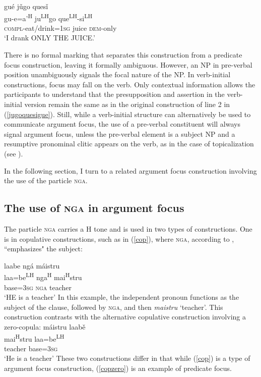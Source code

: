 \ea
\glll gu\'{e} j\v{u}go ques\v{i}  \\
gu-e=a'\textsuperscript{H} ju\textsuperscript{LH}go que\textsuperscript{LH}-si\textsuperscript{LH}  \\
\textsc{compl}-eat/drink=\textsc{1sg} juice \textsc{dem}-only  \\
\glt `I drank ONLY THE JUICE.'  

\z
There is no formal marking that separates this construction from a predicate focus construction, leaving it formally ambiguous. However, an NP in pre-verbal position unambiguously signals the focal nature of the NP. In verb-initial constructions, focus may fall on the verb. Only contextual information allows the participants to understand that the presupposition and assertion in the verb-initial version remain the same as in the original construction of line 2 in (\ref{jugoquesigue}). Still, while a verb-initial structure can alternatively be used to communicate argument focus, the use of a pre-verbal constituent will always signal argument focus, unless the pre-verbal element is a subject NP and a resumptive pronominal clitic appears on the verb, as in the case of topicalization (see ). 

In the following section, I turn to a related argument focus construction involving the use of the particle \textsc{nga}.

\subsection{The use of \textsc{nga} in argument focus}\label{ngaargfoc}

The particle \textsc{nga} carries a H tone and is used in two types of constructions. One is in copulative constructions, such as in (\ref{cop}), where \textsc{nga}, according to \citet[94]{pickett1998}, ``emphasizes" the subject:

\ea\label{cop}
\glll laabe ng\'{a} m\'{a}istru \\
laa=be\textsuperscript{LH} nga\textsuperscript{H} mai\textsuperscript{H}stru \\
base=3\textsc{sg} \textsc{nga} teacher \\
\glt `HE is a teacher' \hfill \citep[94]{pickett1998}
\z
In this example, the independent pronoun functions as the subject of the clause, followed by \textsc{nga}, and then \textit{maistru} `teacher'. This construction contrasts with the alternative copulative construction involving a zero-copula:
\ea\label{copzero}
\glll m\'{a}istru laab\v{e} \\
mai\textsuperscript{H}stru laa=be\textsuperscript{LH} \\
teacher base=3\textsc{sg}  \\
\glt `He is a teacher' 
\z
These two constructions differ in that while (\ref{cop}) is a type of argument focus construction, (\ref{copzero}) is an example of predicate focus. 


